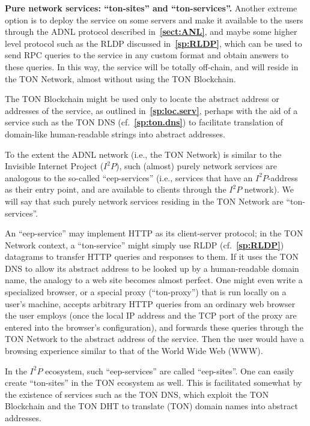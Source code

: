 \documentclass[12pt,oneside]{article}
\def\makepoint#1{\medbreak\noindent{\bf #1.\ }}
\def\nxsubpoint{\refstepcounter{subsubsection}%
  \smallbreak\makepoint{\thesubsubsection}}
\def\refpoint#1{{\rm\textbf{\ref{#1}}}}
\let\ptref=\refpoint
\def\embt(#1.){\textbf{#1.}}
\begin{document}
\nxsubpoint\label{sp:pure.net.serv} \embt(Pure network services:
``ton-sites'' and ``ton-services''.)  Another extreme option is to
deploy the service on some servers and make it available to the users
through the ADNL protocol described in~\ptref{sect:ANL}, and maybe
some higher level protocol such as the RLDP discussed
in~\ptref{sp:RLDP}, which can be used to send RPC queries to the
service in any custom format and obtain answers to these queries. In
this way, the service will be totally off-chain, and will reside in
the TON Network, almost without using the TON Blockchain.

The TON Blockchain might be used only to locate the abstract address
or addresses of the service, as outlined in~\ptref{sp:loc.serv},
perhaps with the aid of a service such as the TON DNS
(cf.~\ptref{sp:ton.dns}) to facilitate translation of domain-like
human-readable strings into abstract addresses.

To the extent the ADNL network (i.e., the TON Network) is similar to
the Invisible Internet Project ($I^2P$), such (almost) purely network
services are analogous to the so-called ``eep-services'' (i.e.,
services that have an $I^2P$-address as their entry point, and are
available to clients through the $I^2P$ network). We will say that
such purely network services residing in the TON Network are
``ton-services''.

An ``eep-service'' may implement HTTP as its client-server protocol;
in the TON Network context, a ``ton-service'' might simply use RLDP
(cf.~\ptref{sp:RLDP}) datagrams to transfer HTTP queries and responses
to them. If it uses the TON DNS to allow its abstract address to be
looked up by a human-readable domain name, the analogy to a web site
becomes almost perfect. One might even write a specialized browser, or
a special proxy (``ton-proxy'') that is run locally on a user's
machine, accepts arbitrary HTTP queries from an ordinary web browser
the user employs (once the local IP address and the TCP port of the
proxy are entered into the browser's configuration), and forwards
these queries through the TON Network to the abstract address of the
service. Then the user would have a browsing experience similar to
that of the World Wide Web (WWW).

In the $I^2P$ ecosystem, such ``eep-services'' are called
``eep-sites''. One can easily create ``ton-sites'' in the TON
ecosystem as well. This is facilitated somewhat by the existence of
services such as the TON DNS, which exploit the TON Blockchain and the
TON DHT to translate (TON) domain names into abstract addresses.
\end{document}
